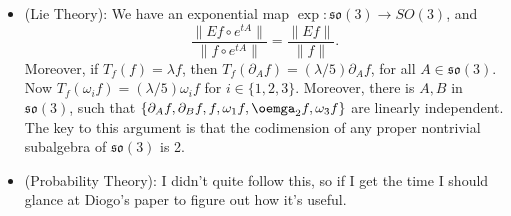 \documentclass[openany,nobib,nols,a4paper,twoside,symmetric,justified,notoc]{tufte-book}
\theoremstyle{plain}
\theoremstyle{remark}
\theoremstyle{definition}
\begin{document}
\begin{itemize}
    \item (Lie Theory): We have an exponential map $\exp: \mathfrak{so}(3) \to SO(3)$, and
    \[ \frac{\| Ef \circ e^{tA} \|}{\| f \circ e^{tA} \|} = \frac{\| Ef \|}{\| f \|}. \]
    Moreover, if $T_f(f) = \lambda f$, then $T_f(\partial_A f) = (\lambda/5) \partial_A f$, for all $A \in \mathfrak{so}(3)$. Now $T_f(\omega_i f) = (\lambda/5) \omega_i f$ for $i \in \{ 1, 2, 3 \}$. Moreover, there is $A,B$ in $\mathfrak{so}(3)$, such that $\{ \partial_A f, \partial_B f, f, \omega_1 f, \oemga_2 f, \omega_3 f \}$ are linearly independent. The key to this argument is that the codimension of any proper nontrivial subalgebra of $\mathfrak{so}(3)$ is 2.

    \item (Probability Theory): I didn't quite follow this, so if I get the time I should glance at Diogo's paper to figure out how it's useful.
\end{itemize}




\end{document}

